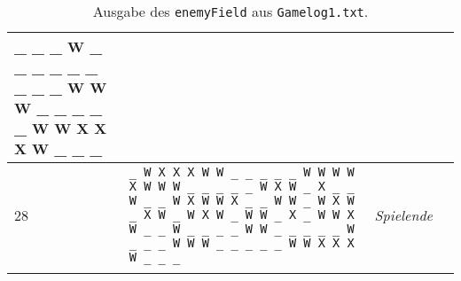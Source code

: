 \begin{longtable}{|m{}|p{}|p{}|m{}|}
{															\_  \_  \_  W  \_  \_  \_  \_  \_  \_\newline
															\_  \_  \_  W  W  W  \_  \_  \_  \_\newline
															\_  W  W  X  X  X  W  \_  \_  \_\newline
															}										& \checkmark \\ \hline
		28	&	\texttt{\_  W  X  X  X  W  W  \_  \_  \_\newline
				\_  \_  W  W  W  W  X  W  W  W\newline
				\_  \_  \_  \_  \_  W  X  W  \_  X\newline
				\_  \_  W  \_  \_  W  X  W  W  X\newline
				\_  \_  W  W  \_  W  X  W  \_  X\newline
				W  \_  W  X  W  \_  W  W  \_  X\newline
				\_  W  W  X  W  \_  \_  W  \_  \_\newline
				\_  \_  W  W  \_  \_  \_  \_  \_  W\newline
				\_  \_  \_  W  W  W  \_  \_  \_  \_\newline
				\_  W  W  X  X  X  W  \_  \_  \_\newline
				}  										& \emph{Spielende}									& \checkmark \\ \hline
	\caption{Ausgabe des \texttt{enemyField} aus \texttt{Gamelog1.txt}.}
	\label{tbl:testfall4}
	\end{longtable}